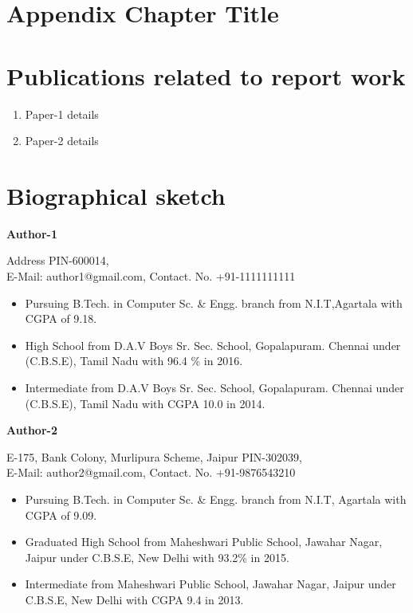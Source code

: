 \documentclass[USenglish,a4paper,12pt]{nitathesis}
\numberwithin{figure}{chapter}
\begin{document}
\chapter{Appendix Chapter Title}


\chapter{Publications related to report work}
\begin{enumerate}	
 \item  Paper-1 details 
 \item Paper-2 details
\end{enumerate}
\chapter{Biographical sketch}
\begin{center}
{\textbf{\large Author-1}}\end{center} %
\begin{center}
Address PIN-600014, \\ E-Mail: author1@gmail.com,  Contact. No. +91-1111111111 \\
 \end{center}
 \begin{itemize}
  \setlength\itemsep{0pt}
\item Pursuing B.Tech. in Computer Sc. \& Engg. branch from N.I.T,Agartala with CGPA of 9.18.
\item High School from D.A.V Boys Sr. Sec. School, Gopalapuram. Chennai under (C.B.S.E), Tamil Nadu with 96.4 \% in 2016.
\item Intermediate from D.A.V Boys Sr. Sec. School, Gopalapuram. Chennai under (C.B.S.E), Tamil Nadu with CGPA 10.0 in 2014.
\end{itemize}
\newpage
\begin{center}
{\textbf{\large Author-2}}\end{center} %
\begin{center}
E-175, Bank Colony, Murlipura Scheme, Jaipur PIN-302039,\\E-Mail: author2@gmail.com,  Contact. No. +91-9876543210 \\
 \end{center}
 \begin{itemize}
 \setlength\itemsep{0pt}
\item Pursuing B.Tech. in Computer Sc. \& Engg. branch from N.I.T, Agartala with CGPA of 9.09.
\item Graduated High School from Maheshwari Public School, Jawahar Nagar, Jaipur under C.B.S.E, New Delhi with 93.2\% in 2015.
\item Intermediate from Maheshwari Public School, Jawahar Nagar, Jaipur under C.B.S.E, New Delhi with CGPA 9.4 in 2013.
\end{itemize}
\end{document}
